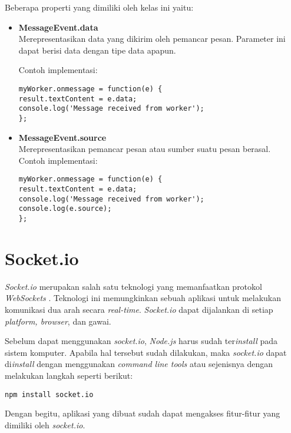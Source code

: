 Beberapa properti yang dimiliki oleh kelas ini yaitu: 

\begin{itemize}
	\item \textbf{MessageEvent.data} \\ Merepresentasikan data yang dikirim oleh pemancar pesan. Parameter ini dapat berisi data dengan tipe data apapun. 
	
	Contoh implementasi:
\begin{lstlisting}
myWorker.onmessage = function(e) {
result.textContent = e.data;
console.log('Message received from worker');
};
\end{lstlisting}
	
	
	\item \textbf{MessageEvent.source} \\ Merepresentasikan pemancar pesan atau sumber suatu pesan berasal. \\
	Contoh implementasi:
\begin{lstlisting}
myWorker.onmessage = function(e) {
result.textContent = e.data;
console.log('Message received from worker');
console.log(e.source);
};
	\end{lstlisting}
\end{itemize}


\section{Socket.io}
\label{sec:Socket.io}

\textit{Socket.io} merupakan salah satu teknologi yang memanfaatkan protokol \textit{WebSockets} \cite{socketio}. Teknologi ini memungkinkan sebuah aplikasi untuk melakukan komunikasi dua arah secara \textit{real-time}. \textit{Socket.io} dapat dijalankan di setiap \textit{platform, browser}, dan gawai.

Sebelum dapat menggunakan \textit{socket.io}, \textit{Node.js} harus sudah ter\textit{install} pada sistem komputer. Apabila hal tersebut sudah dilakukan, maka \textit{socket.io} dapat di\textit{install} dengan menggunakan \textit{command line tools} atau sejenisnya dengan melakukan langkah seperti berikut:
\begin{lstlisting}
npm install socket.io
\end{lstlisting}

Dengan begitu, aplikasi yang dibuat sudah dapat mengakses fitur-fitur yang dimiliki oleh \textit{socket.io}.

